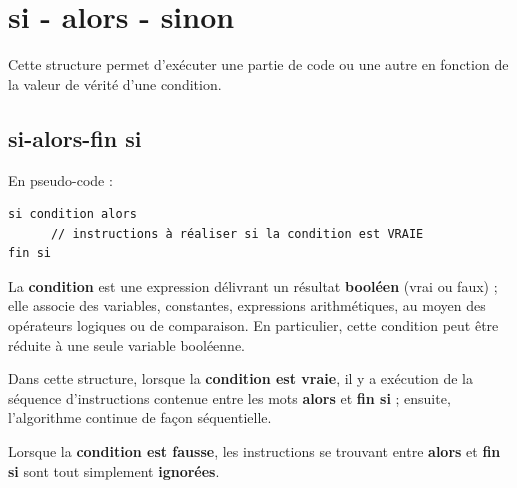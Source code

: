 \documentclass[11pt,a4paper]{article}
\begin{document}
            \begin{abstract}
			Ce TD a pour but d'aborder les structures alternatives qui permettent de conditionner
      des parties d'algorithmes, de code. Elles ne seront ex\'ecut\'ees que si une condition est satisfaite.
		
            \par
        \end{abstract}
				\vspace{-2em}\tableofcontents
				\pagestyle{plain}
            \clearpage
            \fancyhead[L,C,R]{}
            \fancyfoot[L,C]{}
            \fancyfoot[R]{ \scriptsize{\textcolor{gray}{
				TDAlt - page \thepage}}}
				\thispagestyle{fancy}
				\pagestyle{fancy}
	   
            \section{si - alors - sinon}Cette structure permet d'ex\'ecuter une partie de code 
    ou une autre en fonction de la valeur de v\'erit\'e d'une condition.\subsection{si-alors-fin si}En pseudo-code :
            \par
        \begin{verbatim}
si condition alors
      // instructions à réaliser si la condition est VRAIE
fin si
      \end{verbatim}
        La \textbf{condition} est une expression d\'elivrant un r\'esultat 
        \textbf{bool\'een} (vrai ou faux) ; elle associe
        des variables, constantes, expressions arithm\'etiques, au moyen des op\'erateurs logiques ou de
        comparaison. En particulier, cette condition peut \^etre r\'eduite \`a une seule variable bool\'eenne.
      
            \par
        
        Dans cette structure, lorsque la \textbf{condition est vraie}, il y a ex\'ecution 
        de la s\'equence d'instructions contenue entre les mots \textbf{alors} 
        et \textbf{fin si} ; ensuite, l'algorithme continue de fa\c con
        s\'equentielle.
      
            \par
        
        Lorsque la \textbf{condition est fausse}, 
        les instructions se trouvant entre \textbf{alors} 
        et \textbf{fin si} sont tout simplement \textbf{ignor\'ees}.
      
\end{document}
